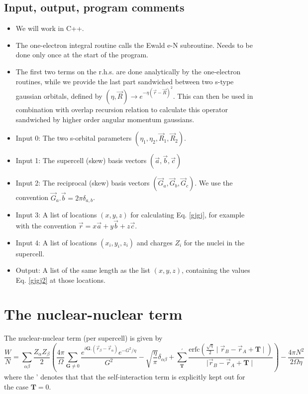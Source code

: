 \documentclass[11pt,a4paper]{article}
\begin{document}
\subsection{Input, output, program comments}
\begin{itemize}
\item We will work in C++.
\item The one-electron integral routine calls the Ewald e-N subroutine. Needs to be done only once at the start of the program.
\item The first two terms on the r.h.s. are done analytically by the one-electron routines, while we provide the last part sandwiched between two s-type gaussian orbitals, defined by $(\eta,\vec{R}) \rightarrow e^{-\eta (\vec{r} - \vec{R})^2}$. This can then be used in combination with overlap recursion relation to calculate this operator sandwiched by higher order angular momentum gaussians.
\item Input 0: The two s-orbital parameters $(\eta_1,\eta_2,\vec{R}_1,\vec{R}_2)$.
\item Input 1: The supercell (skew) basis vectors $(\vec{a},\vec{b},\vec{c})$
\item Input 2: The reciprocal (skew) basis vectors $(\vec{G}_a,\vec{G}_b,\vec{G}_c)$. We use the convention $\vec{G}_a . \vec{b} = 2 \pi \delta_{a,b}$.
\item Input 3: A list of locations $(x,y,z)$ for calculating Eq. \eqref{gjgj}, for example with the convention $\vec{r} = x \vec{a} + y \vec{b} + z \vec{c}$.
\item Input 4: A list of locations $(x_i,y_i,z_i)$ and charges $Z_i$ for the nuclei in the supercell.
\item Output: A list of the same length as the list $(x,y,z)$, containing the values Eq. \eqref{gjgj2} at those locations.
\end{itemize}
\section{The nuclear-nuclear term}
The nuclear-nuclear term (per supercell) is given by
\begin{equation}
\frac{W}{N} = \sum\limits_{\alpha\beta} \frac{Z_{\alpha}Z_{\beta}}{2} \left( \frac{4\pi}{\Omega} \sum\limits_{\mathbf{G} \neq 0} \frac{e^{i \mathbf{G}.(\vec{r}_{\beta} - \vec{r}_{\alpha})} e^{-G^2/\eta}}{G^2} - \sqrt{\frac{\eta}{\pi}} \delta_{\alpha\beta} + \sum\limits_{\mathbf{T}}^{'} \frac{\text{erfc}\left( \frac{\sqrt{\eta}}{2} \mid \vec{r}_B - \vec{r}_A + \mathbf{T} \mid \right)}{\mid \vec{r}_B - \vec{r}_A + \mathbf{T} \mid}  \right) - \frac{4 \pi N^2}{2 \Omega \eta} \label{gjgj3}
\end{equation}
where the ' denotes that that the self-interaction term is explicitly kept out for the case $\mathbf{T} = 0$.
\end{document}
